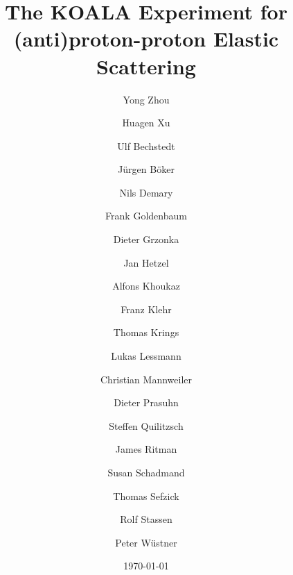\documentclass[number,5p]{elsarticle}
\begin{document}
\begin{frontmatter}	
  \title{The KOALA Experiment for (anti)proton-proton Elastic Scattering}
  \date{\today}

  \author[ikp]{Yong Zhou}
  \author[ikp]{Huagen Xu}

  \author[ikp]{Ulf Bechstedt}
  \author[ikp]{Jürgen Böker}
  \author[ikp]{Nils Demary}
  \author[ikp]{Frank Goldenbaum}
  \author[ikp]{Dieter Grzonka}
  \author[ikp]{Jan Hetzel}
  \author[muenster]{Alfons Khoukaz}
  \author[ikp]{Franz Klehr}
  \author[ikp]{Thomas Krings}
  \author[muenster]{Lukas Lessmann}
  \author[muenster]{Christian Mannweiler}
  \author[ikp]{Dieter Prasuhn}
  \author[ikp]{Steffen Quilitzsch}
  \author[gsi,bochum,ikp]{James Ritman}
  \author[ikp]{Susan Schadmand}
  \author[ikp]{Thomas Sefzick}
  \author[ikp]{Rolf Stassen}
  \author[zea]{Peter Wüstner}


  \address[ikp]{Institut für Kernphysik, Forschungszentrum Jülich, Jülich, 52425, Germany}
  \address[muenster]{Institut für Kernphysik, Universität Münster, Münster, 48149, Germany}
  \address[bochum]{Ruhr-Universität Bochum, Bochum, 44780, Germany}
  \address[gsi]{GSI Helmholtzzentrum für Schwerionenforschung GmbH, Darmstadt, 64291, Germany}
  \address[zea]{Zentralinstitut für Engineering, Elektronik und Analytik, Forschungszentrum Jülich, Jülich, 52425, Germany}


  \begin{abstract}



\end{abstract}
\end{frontmatter}
\end{document}
